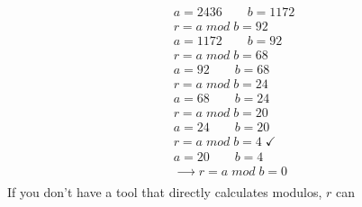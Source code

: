 \documentclass[
  letterpaper,
]{book}
\begin{document}
\[
\begin{gather}
a = 2436 \qquad b = 1172 \\
r = a\;mod\;b = 92 \\[1em]
a = 1172 \qquad b = 92 \\
r = a\;mod\;b = 68 \\[1em]
a = 92 \qquad b = 68 \\
r = a\;mod\;b = 24 \\[1em]
a = 68 \qquad b = 24 \\
r = a\;mod\;b = 20 \\[1em]
a = 24 \qquad b = 20 \\
r = a\;mod\;b = 4\; ✓ \\[1em]
a = 20 \qquad b = 4 \\
⟶ r = a\;mod\;b = 0 \\
\end{gather}
\] If you don't have a tool that directly calculates modulos, \(r\) can
\end{document}

